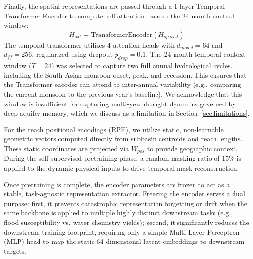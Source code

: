 \documentclass[preprint,12pt]{elsarticle}
\begin{document}
Finally, the spatial representations are passed through a 1-layer Temporal Transformer Encoder to compute self-attention~\citep{vaswani2017attention} across the 24-month context window:
\begin{equation}
H_{out} = \text{TransformerEncoder}(H_{spatial})
\end{equation}
The temporal transformer utilizes 4 attention heads with $d_{model} = 64$ and $d_{ff} = 256$, regularized using dropout $p_{drop} = 0.1$. The 24-month temporal context window ($T=24$) was selected to capture two full annual hydrological cycles, including the South Asian monsoon onset, peak, and recession. This ensures that the Transformer encoder can attend to inter-annual variability (e.g., comparing the current monsoon to the previous year's baseline). We acknowledge that this window is insufficient for capturing multi-year drought dynamics governed by deep aquifer memory, which we discuss as a limitation in Section~\ref{sec:limitations}.

For the reach positional encodings (RPE), we utilize static, non-learnable geometric vectors computed directly from subbasin centroids and reach lengths. These static coordinates are projected via $W_{pos}$ to provide geographic context. During the self-supervised pretraining phase, a random masking ratio of $15\%$ is applied to the dynamic physical inputs to drive temporal mask reconstruction. 

Once pretraining is complete, the encoder parameters are frozen to act as a stable, task-agnostic representation extractor. Freezing the encoder serves a dual purpose: first, it prevents catastrophic representation forgetting or drift when the same backbone is applied to multiple highly distinct downstream tasks (e.g., flood susceptibility vs. water chemistry yields); second, it significantly reduces the downstream training footprint, requiring only a simple Multi-Layer Perceptron (MLP) head to map the static 64-dimensional latent embeddings to downstream targets.
\end{document}
